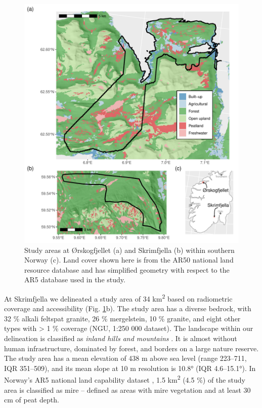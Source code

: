 \documentclass[soil, manuscript]{copernicus}
\begin{document}
\begin{figure}
\includegraphics[height=0.9\textheight]{figures/sites-patchwork} \caption{Study areas at Ørskogfjellet (a) and Skrimfjella (b) within southern Norway (c). Land cover shown here is from the AR50 national land resource database and has simplified geometry with respect to the AR5 database used in the study.}\label{fig:sites}
\end{figure}

At Skrimfjella we delineated a study area of 34 km\textsuperscript{2} based on radiometric coverage and accessibility (Fig. \ref{fig:sites}b).
The study area has a diverse bedrock, with 32 \% alkali feltspat granite, 26 \% mergelstein, 10 \% granite, and eight other types with \textgreater{} 1 \% coverage (NGU, 1:250 000 dataset).
The landscape within our delineation is classified as \emph{inland hills and mountains} \citep{simensenDiversityDistributionLandscape2021}.
It is almost without human infrastructure, dominated by forest, and borders on a large nature reserve.
The study area has a mean elevation of 438 m above sea level (range 223--711, IQR 351--509), and its mean slope at 10 m resolution is 10.8° (IQR 4.6--15.1°).
In Norway's AR5 national land capability dataset \citep{ahlstromAR5Klassifikasjonssystem2019}, 1.5 km\textsuperscript{2} (4.5 \%) of the study area is classified as mire -- defined as areas with mire vegetation and at least 30 cm of peat depth.
\end{document}
